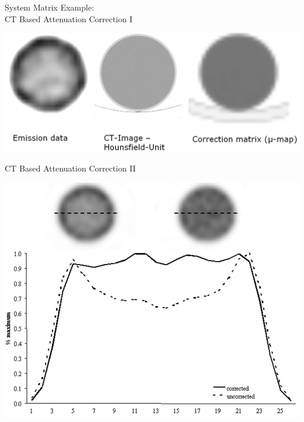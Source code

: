 
\begin{frame}{System Matrix Example:\\ CT Based Attenuation Correction I}
    \begin{center}\includegraphics[width=1.0\textwidth]{images/atten_corr}\\
    \end{center}
\end{frame}

\begin{frame}{CT Based Attenuation Correction II}
    \begin{center}
        \includegraphics[height=0.8\textheight]{images/atten_corr_2}
    \end{center}
\end{frame}

